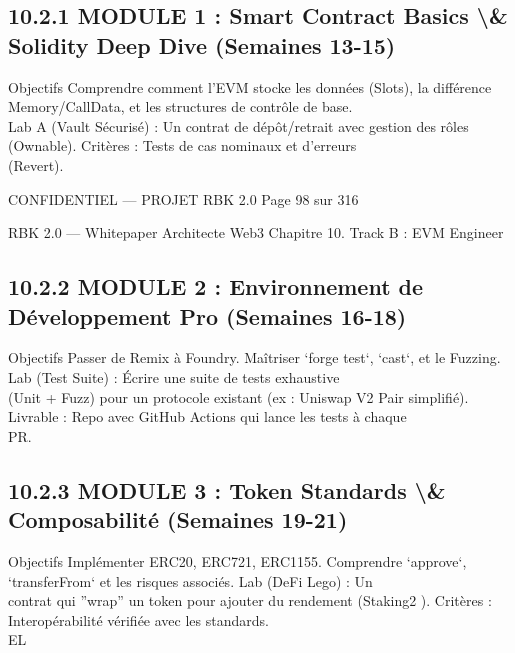 \documentclass[12pt,landscape,a4paper]{article}
\newenvironment{confidential}
{\begin{tcolorbox}[
    colback=rbkred!5!white,
    colframe=rbkred!75!black,
    title=CONFIDENTIEL,
    fonttitle=\bfseries\color{white},
    coltitle=rbkred!75!black,
    breakable,
    enhanced,
    frame hidden,
    borderline west={2pt}{0pt}{rbkred!75!black}
]}
{\end{tcolorbox}}
\begin{document}
\subsection{10.2.1 MODULE 1 : Smart Contract Basics \textbackslash{}& Solidity Deep Dive (Semaines 13-15)}
Objectifs Comprendre comment l’EVM stocke les données (Slots), la différence Memory/CallData, et les structures de contrôle de base.\\
Lab A (Vault Sécurisé) : Un contrat de dépôt/retrait avec gestion des rôles (Ownable). Critères : Tests de cas nominaux et d’erreurs\\
(Revert).\\
\vspace{0.5em}
\vspace{0.5em}
\vspace{0.5em}
\vspace{0.5em}
\begin{confidential}CONFIDENTIEL — PROJET RBK 2.0                                Page 98 sur 316\end{confidential}
RBK 2.0 — Whitepaper Architecte Web3                                                                                      Chapitre 10. Track B : EVM Engineer\\
\vspace{0.5em}
\vspace{0.5em}
\subsection{10.2.2 MODULE 2 : Environnement de Développement Pro (Semaines 16-18)}
\vspace{0.5em}
Objectifs Passer de Remix à Foundry. Maîtriser ‘forge test‘, ‘cast‘, et le Fuzzing. Lab (Test Suite) : Écrire une suite de tests exhaustive\\
(Unit + Fuzz) pour un protocole existant (ex : Uniswap V2 Pair simplifié). Livrable : Repo avec GitHub Actions qui lance les tests à chaque\\
PR.\\
\vspace{0.5em}
\vspace{0.5em}
\subsection{10.2.3 MODULE 3 : Token Standards \textbackslash{}& Composabilité (Semaines 19-21)}
Objectifs Implémenter ERC20, ERC721, ERC1155. Comprendre ‘approve‘, ‘transferFrom‘ et les risques associés. Lab (DeFi Lego) : Un\\
contrat qui ”wrap” un token pour ajouter du rendement (Staking2 ). Critères : Interopérabilité vérifiée avec les standards.\\
\vspace{0.5em}
\vspace{0.5em}
\vspace{0.5em}
\vspace{0.5em}
EL\\
\end{document}
